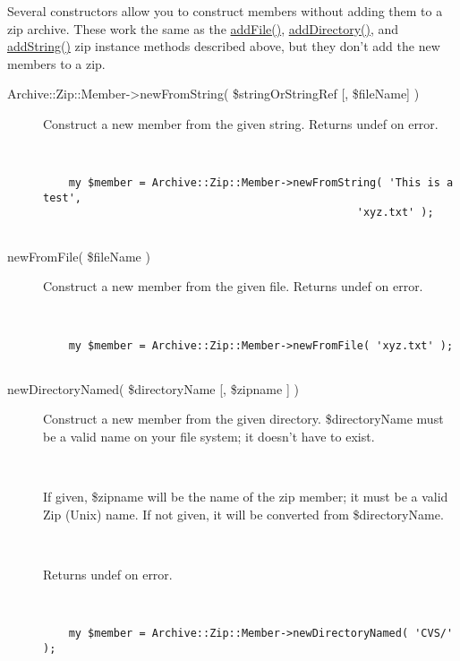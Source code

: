 \documentclass[]{article}
\renewcommand{\emph}[1]{\underline{#1}}
\begin{document}


Several constructors allow you to construct members without adding them
to a zip archive. These work the same as the \emph{addFile()},
\emph{addDirectory()}, and \emph{addString()} zip instance methods
described above, but they don't add the new members to a zip.

\begin{description}
\item[Archive::Zip::Member-\textgreater{}newFromString(
\$stringOrStringRef {[}, \$fileName{]} )]
Construct a new member from the given string. Returns undef on error.

~

\begin{verbatim}
    my $member = Archive::Zip::Member->newFromString( 'This is a test',
                                                 'xyz.txt' );
    
\end{verbatim}
\end{description}

\begin{description}
\item[newFromFile( \$fileName )]
Construct a new member from the given file. Returns undef on error.

~

\begin{verbatim}
    my $member = Archive::Zip::Member->newFromFile( 'xyz.txt' );
    
\end{verbatim}
\end{description}

\begin{description}
\item[newDirectoryNamed( \$directoryName {[}, \$zipname {]} )]
Construct a new member from the given directory. \$directoryName must be
a valid name on your file system; it doesn't have to exist.

~

If given, \$zipname will be the name of the zip member; it must be a
valid Zip (Unix) name. If not given, it will be converted from
\$directoryName.

~

Returns undef on error.

~

\begin{verbatim}
    my $member = Archive::Zip::Member->newDirectoryNamed( 'CVS/' );
    
\end{verbatim}
\end{description}
\end{document}
